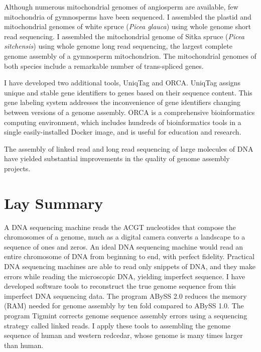 \documentclass[
  12pt,
  oneside,
  openany]{book}
\begin{document}
Although numerous mitochondrial genomes of angiosperm are available, few mitochondria of gymnosperms have been sequenced. I assembled the plastid and mitochondrial genomes of white spruce (\emph{Picea glauca}) using whole genome short read sequencing. I assembled the mitochondrial genome of Sitka spruce (\emph{Picea sitchensis}) using whole genome long read sequencing, the largest complete genome assembly of a gymnosperm mitochondrion. The mitochondrial genomes of both species include a remarkable number of trans-spliced genes.

I have developed two additional tools, UniqTag and ORCA. UniqTag assigns unique and stable gene identifiers to genes based on their sequence content. This gene labeling system addresses the inconvenience of gene identifiers changing between versions of a genome assembly. ORCA is a comprehensive bioinformatics computing environment, which includes hundreds of bioinformatics tools in a single easily-installed Docker image, and is useful for education and research.

The assembly of linked read and long read sequencing of large molecules of DNA have yielded substantial improvements in the quality of genome assembly projects.

\newpage

\hypertarget{lay-summary}{%
\section{Lay Summary}\label{lay-summary}}

A DNA sequencing machine reads the ACGT nucleotides that compose the chromosomes of a genome, much as a digital camera converts a landscape to a sequence of ones and zeros. An ideal DNA sequencing machine would read an entire chromosome of DNA from beginning to end, with perfect fidelity. Practical DNA sequencing machines are able to read only snippets of DNA, and they make errors while reading the microscopic DNA, yielding imperfect sequence. I have developed software tools to reconstruct the true genome sequence from this imperfect DNA sequencing data. The program ABySS 2.0 reduces the memory (RAM) needed for genome assembly by ten fold compared to ABySS 1.0. The program Tigmint corrects genome sequence assembly errors using a sequencing strategy called linked reads. I apply these tools to assembling the genome sequence of human and western redcedar, whose genome is many times larger than human.

\newpage
\end{document}
